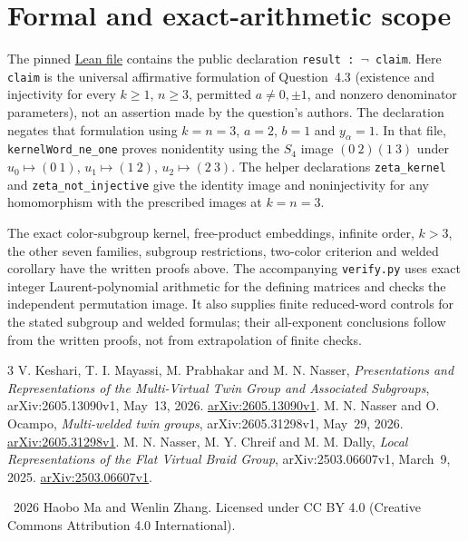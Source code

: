 \documentclass[11pt]{article}
\begin{document}
\section{Formal and exact-arithmetic scope}
The pinned
\href{https://github.com/the-omega-institute/trureturing/blob/4a7117cee792c7d5598d7f4770577d557fb45137/D5/S3/Quantum/Algebra/Knot/MultiVirtualTwinZetaEightFaithfulnessRefutation.lean}{Lean file}
contains the public declaration \texttt{result : $\neg$ claim}.
Here \texttt{claim} is the universal affirmative formulation of Question~4.3
(existence and injectivity for every $k\ge1$, $n\ge3$, permitted
$a\ne0,\pm1$, and nonzero denominator parameters), not an assertion
made by the question's authors.
The declaration negates that formulation using $k=n=3$, $a=2$, $b=1$
and $y_\alpha=1$.
In that file, \texttt{kernelWord\_ne\_one} proves nonidentity using
the $S_4$ image $(0\ 2)(1\ 3)$ under
$u_0\mapsto(0\ 1)$, $u_1\mapsto(1\ 2)$, $u_2\mapsto(2\ 3)$.
The helper declarations \texttt{zeta\_kernel} and
\texttt{zeta\_not\_injective} give the identity image and
noninjectivity for any homomorphism with the prescribed images at $k=n=3$.

The exact color-subgroup kernel, free-product embeddings, infinite order,
$k>3$, the other seven families, subgroup restrictions, two-color criterion
and welded corollary have the written proofs above.
The accompanying \texttt{verify.py} uses exact integer Laurent-polynomial
arithmetic for the defining matrices and checks the independent permutation
image. It also supplies finite reduced-word controls for the stated
subgroup and welded formulas; their all-exponent conclusions follow
from the written proofs, not from extrapolation of finite checks.

\begin{thebibliography}{3}
V. Keshari, T. I. Mayassi, M. Prabhakar and M. N. Nasser,
\emph{Presentations and Representations of the Multi-Virtual Twin Group
and Associated Subgroups}, arXiv:2605.13090v1, May~13, 2026.
\href{https://arxiv.org/abs/2605.13090v1}{arXiv:2605.13090v1}.
M. N. Nasser and O. Ocampo, \emph{Multi-welded twin groups},
arXiv:2605.31298v1, May~29, 2026.
\href{https://arxiv.org/abs/2605.31298v1}{arXiv:2605.31298v1}.
M. N. Nasser, M. Y. Chreif and M. M. Dally,
\emph{Local Representations of the Flat Virtual Braid Group},
arXiv:2503.06607v1, March~9, 2025.
\href{https://arxiv.org/abs/2503.06607v1}{arXiv:2503.06607v1}.
\end{thebibliography}
\noindent\footnotesize\textcopyright\ 2026 Haobo Ma and Wenlin Zhang.
Licensed under CC BY 4.0 (Creative Commons Attribution 4.0 International).
\end{document}
